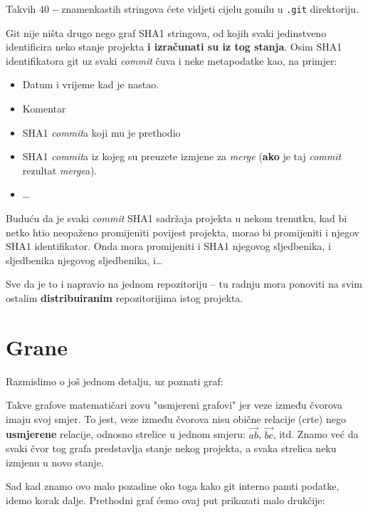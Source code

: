 Takvih $40-$znamenkastih stringova ćete vidjeti cijelu gomilu u \verb+.git+ direktoriju.

Git nije ništa drugo nego graf SHA1 stringova, od kojih svaki jedinstveno identificira neko stanje projekta \textbf{i izračunati su iz tog stanja}.
Osim SHA1 identifikatora git uz svaki \emph{commit} čuva i neke metapodatke kao, na primjer:

\begin{itemize}
	\item Datum i vrijeme kad je nastao.
	\item Komentar
	\item SHA1 \emph{commit}a koji mu je prethodio
	\item SHA1 \emph{commit}a iz kojeg su preuzete izmjene za \emph{merge} (\textbf{ako} je taj \emph{commit} rezultat \emph{merge}a).
	\item \dots
\end{itemize}

Buduću da je svaki \emph{commit} SHA1 sadržaja projekta u nekom trenutku, kad bi netko htio neopaženo promijeniti povijest projekta, morao bi promijeniti i njegov SHA1 identifikator.
Onda mora promijeniti i SHA1 njegovog sljedbenika, i sljedbenika njegovog sljedbenika, i\dots

Sve da je to i napravio na jednom repozitoriju -- tu radnju mora ponoviti na svim ostalim \textbf{distribuiranim} repozitorijima istog projekta.

\section*{Grane}

Razmislimo o još jednom detalju, uz poznati graf:



Takve grafove matematičari zovu "usmjereni grafovi" jer veze između čvorova imaju svoj smjer.
To jest, veze između čvorova nisu obične relacije (crte) nego \textbf{usmjerene} relacije, odnosno strelice u jednom smjeru: $\vec{ab}$, $\vec{bc}$, itd.
Znamo već da svaki čvor tog grafa predstavlja stanje nekog projekta, a svaka strelica neku izmjenu u novo stanje.

Sad kad znamo ovo malo pozadine oko toga kako git interno pamti podatke, idemo korak dalje.
Prethodni graf ćemo ovaj put prikazati malo drukčije:




